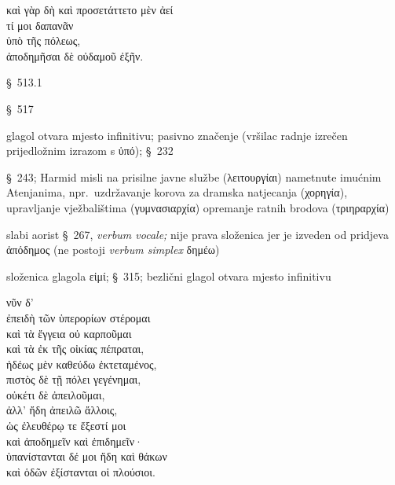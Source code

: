 {\large
\begin{greek}
καὶ γὰρ δὴ καὶ προσετάττετο μὲν ἀεί \\
\tabto{2em} τί μοι δαπανᾶν \\
\tabto{2em} ὑπὸ τῆς πόλεως, \\
ἀποδημῆσαι δὲ οὐδαμοῦ ἐξῆν.\\

\end{greek}
}

\begin{description}[noitemsep]
\item[καὶ\dots\ δὴ καὶ\dots] §~513.1
\item[γὰρ] §~517
\item[προσετάττετο] glagol otvara mjesto infinitivu; pasivno značenje (vršilac radnje izrečen prijedložnim izrazom s ὑπό); §~232
\item[δαπανᾶν] §~243; Harmid misli na prisilne javne službe (λειτουργίαι) nametnute imućnim Atenjanima, npr.\ uzdržavanje korova za dramska natjecanja (χορηγία), upravljanje vježbalištima (γυμνασιαρχία) opremanje ratnih brodova (τριηραρχία)
\item[ἀποδημῆσαι] slabi aorist §~267, \textit{verbum vocale;} nije prava složenica jer je izveden od pridjeva ἀπόδημος (ne postoji \textit{verbum simplex} δημέω)
\item[ἐξῆν] složenica glagola εἰμί; §~315; bezlični glagol otvara mjesto infinitivu
\end{description}


{\large
\begin{greek}
\noindent νῦν δ' \\
ἐπειδὴ τῶν ὑπερορίων στέρομαι \\
\tabto{2em} καὶ τὰ ἔγγεια οὐ καρποῦμαι \\
\tabto{2em} καὶ τὰ ἐκ τῆς οἰκίας πέπραται, \\
ἡδέως μὲν καθεύδω ἐκτεταμένος, \\
πιστὸς δὲ τῇ πόλει γεγένημαι, \\
οὐκέτι δὲ ἀπειλοῦμαι, \\
ἀλλ' ἤδη ἀπειλῶ ἄλλοις, \\
ὡς ἐλευθέρῳ τε ἔξεστί μοι \\
\tabto{2em} καὶ ἀποδημεῖν καὶ ἐπιδημεῖν· \\
ὑπανίστανται δέ μοι ἤδη καὶ θάκων \\
καὶ ὁδῶν ἐξίστανται οἱ πλούσιοι.\\

\end{greek}
}

